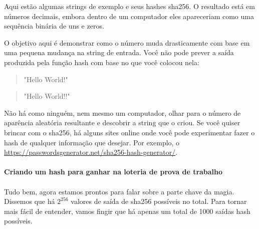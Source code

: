 Aqui estão algumas strings de exemplo e seus hashes sha256. O resultado está em números decimais, embora dentro de um computador eles apareceriam como uma sequência binária de uns e zeros.

O objetivo aqui é demonstrar como o número muda drasticamente com base em uma pequena mudança na string de entrada. Você não pode prever a saída produzida pela função hash com base no que você colocou nela:

\begin{samepage}
\begin{quote}{"Hello World!"\newline
}\end{quote}
\end{samepage}

\begin{samepage}
\begin{quote}{"Hello World!!"\newline
}\end{quote}
\end{samepage}

Não há como ninguém, nem mesmo um computador, olhar para o número de aparência aleatória resultante e descobrir a string que o criou. Se você quiser brincar com o sha256, há alguns sites online onde você pode experimentar fazer o hash de qualquer informação que desejar. Por exemplo, o \url{https://passwordsgenerator.net/sha256-hash-generator/}.

\paragraph{Criando um hash para ganhar na loteria de prova de trabalho}
\paragraph{}
 

Tudo bem, agora estamos prontos para falar sobre a parte chave da magia. Dissemos que há \(2^{256}\) valores de saída de sha256 possíveis no total. Para tornar mais fácil de entender, vamos fingir que há apenas um total de 1000 saídas hash possíveis.

